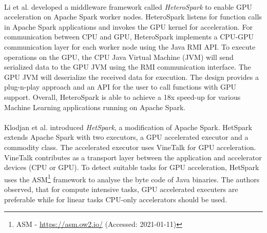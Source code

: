 \paragraph{}
Li et al. \cite{Li2015HeteroSpark} developed a middleware framework called \textit{HeteroSpark} to enable GPU acceleration on Apache Spark worker nodes. HeteroSpark listens for function calls in Apache Spark applications and invokes the GPU kernel for acceleration. For communication between CPU and GPU, HeteroSpark implements a CPU-GPU communication layer for each worker node using the Java RMI API. To execute operations on the GPU, the CPU Java Virtual Machine (JVM) will send serialized data to the GPU JVM using the RMI communication interface. The GPU JVM will deserialize the received data for execution.
The design provides a plug-n-play approach and an API for the user to call functions with GPU support.
Overall, HeteroSpark is able to achieve a 18x speed-up for various Machine Learning applications running on Apache Spark.


\paragraph{}
Klodjan et al. \cite{Klodjan2018HetSpark} introduced \textit{HetSpark}, a modification of Apache Spark.
HetSpark extends Apache Spark with two executors, a GPU accelerated executor and a commodity class. 
The accelerated executor uses VineTalk\cite{Mavridis2017VineTalk} for GPU acceleration.
VineTalk contributes as a transport layer between the application and accelerator devices (CPU or GPU).
To detect suitable tasks for GPU acceleration, HetSpark uses the ASM\footnote{ASM - \url{https://asm.ow2.io/} (Accessed: 2021-01-11)} framework to analyse the byte code of Java binaries.
The authors observed, that for compute intensive tasks, GPU accelerated executers are preferable while for linear tasks CPU-only accelerators should be used.


